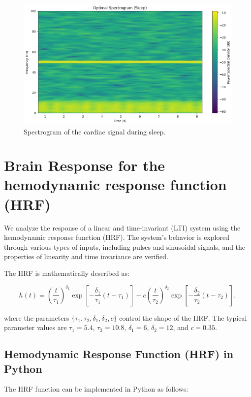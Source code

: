 \documentclass[10pt]{article}
\theoremstyle{definition}
\theoremstyle{remark}
\theoremstyle{definition}
\numberwithin{equation}{prob}
\begin{document}
\begin{figure}[h]
    \centering
    \includegraphics[width=0.8\linewidth]{./figures/Optimal Spectrogram (Sleep).png}
    \caption{Spectrogram of the cardiac signal during sleep.}
\end{figure}


\section{Brain Response for the hemodynamic response function (HRF)}

We analyze the response of a linear and time-invariant (LTI) system using the hemodynamic response function (HRF). The system’s behavior is explored through various types of inputs, including pulses and sinusoidal signals, and the properties of linearity and time invariance are verified.

The HRF is mathematically described as:

\begin{equation}
h(t) = \left( \frac{t}{\tau_1} \right)^{\delta_1} \exp\left[ -\frac{\delta_1}{\tau_1} (t-\tau_1) \right] - c \left( \frac{t}{\tau_2} \right)^{\delta_2} \exp\left[ -\frac{\delta_2}{\tau_2} (t-\tau_2) \right],
\end{equation}

where the parameters $\{\tau_1,\tau_2,\delta_1,\delta_2,c\}$ control the shape of the HRF. The typical parameter values are $\tau_1=5.4$, $\tau_2=10.8$, $\delta_1=6$, $\delta_2=12$, and $c=0.35$.

\subsection{Hemodynamic Response Function (HRF) in Python}

The HRF function can be implemented in Python as follows:
\end{document}
